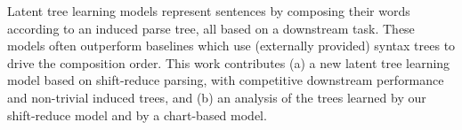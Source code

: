 Latent tree learning models represent sentences by composing their words according to an induced parse tree, all based on a downstream task. These models often outperform baselines which use (externally provided) syntax trees to drive the composition order. This work contributes (a) a new latent tree learning model based on shift-reduce parsing, with competitive downstream performance and non-trivial induced trees, and (b) an analysis of the trees learned by our shift-reduce model and by a chart-based model.
